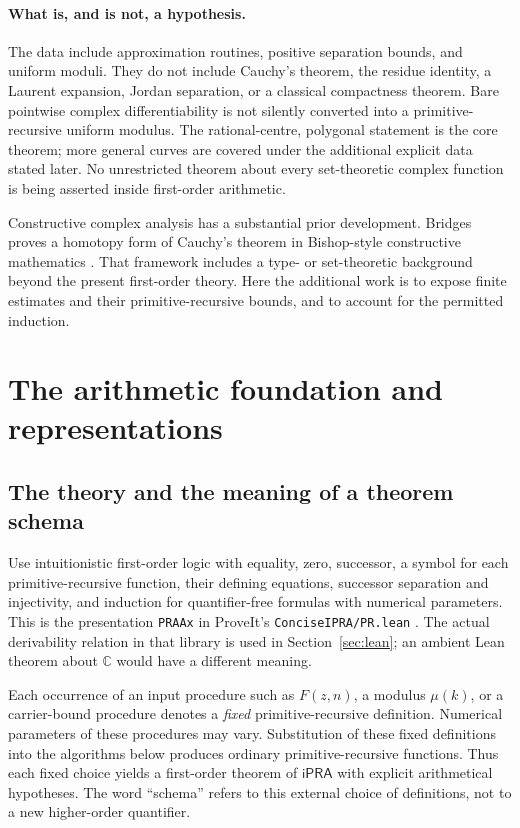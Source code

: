 \documentclass[11pt]{article}
\theoremstyle{definition}
\newcommand{\C}{\mathbb C}
\newcommand{\ipra}{\mathsf{iPRA}}
\newcommand{\code}[1]{\texttt{#1}}
\begin{document}
\paragraph{What is, and is not, a hypothesis.}
The data include approximation routines, positive separation bounds,
and uniform moduli. They do not include Cauchy's theorem, the residue
identity, a Laurent expansion, Jordan separation, or a classical
compactness theorem. Bare pointwise complex differentiability is not
silently converted into a primitive-recursive uniform modulus.
The rational-centre, polygonal statement is the core theorem; more
general curves are covered under the additional explicit data stated
later. No unrestricted theorem about every set-theoretic complex function
is being asserted inside first-order arithmetic.

Constructive complex analysis has a substantial prior development.
Bridges proves a homotopy form of Cauchy's theorem in Bishop-style
constructive mathematics \cite{bridges}. That framework includes a
type- or set-theoretic background beyond the present first-order theory.
Here the additional work is to expose finite estimates and their
primitive-recursive bounds, and to account for the permitted induction.

\section{The arithmetic foundation and representations}\label{sec:foundation}

\subsection{The theory and the meaning of a theorem schema}

Use intuitionistic first-order logic with equality, zero, successor, a
symbol for each primitive-recursive function, their defining equations,
successor separation and injectivity, and induction for quantifier-free
formulas with numerical parameters. This is the presentation
\code{PRAAx} in ProveIt's \code{ConciseIPRA/PR.lean} \cite{prsource}.
The actual derivability relation in that library is used in
Section~\ref{sec:lean}; an ambient Lean theorem about \(\C\) would have a
different meaning.

Each occurrence of an input procedure such as \(F(z,n)\), a modulus
\(\mu(k)\), or a carrier-bound procedure denotes a \emph{fixed}
primitive-recursive definition. Numerical parameters of these procedures
may vary. Substitution of these fixed definitions into the algorithms
below produces ordinary primitive-recursive functions. Thus each fixed
choice yields a first-order theorem of \(\ipra\) with explicit
arithmetical hypotheses. The word ``schema'' refers to this external
choice of definitions, not to a new higher-order quantifier.
\end{document}
